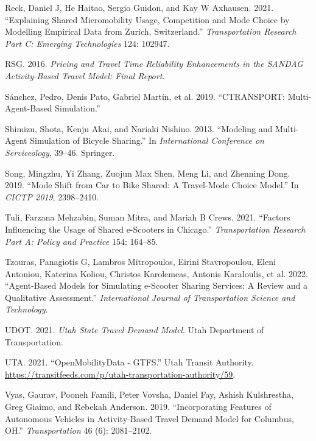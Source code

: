 \documentclass[12pt, oneside, openright]{byuthesis}
\newlength{\cslhangindent}
\newlength{\cslentryspacingunit} %
\newenvironment{CSLReferences}[2] %
 {%
  \setlength{\parindent}{0pt}
  \ifodd #1
  \let\oldpar\par
  \def\par{\hangindent=\cslhangindent\oldpar}
  \fi
  \setlength{\parskip}{#2\cslentryspacingunit}
 }%
 {}
\begin{document}
\begin{CSLReferences}{1}{0}
\leavevmode{}%
Reck, Daniel J, He Haitao, Sergio Guidon, and Kay W Axhausen. 2021. {``Explaining Shared Micromobility Usage, Competition and Mode Choice by Modelling Empirical Data from Zurich, Switzerland.''} \emph{Transportation Research Part C: Emerging Technologies} 124: 102947.

\leavevmode{}%
RSG. 2016. \emph{Pricing and Travel Time Reliability Enhancements in the SANDAG Activity-Based Travel Model: Final Report}.

\leavevmode{}%
Sánchez, Pedro, Denis Pato, Gabriel Martín, et al. 2019. {``CTRANSPORT: Multi-Agent-Based Simulation.''}

\leavevmode{}%
Shimizu, Shota, Kenju Akai, and Nariaki Nishino. 2013. {``Modeling and Multi-Agent Simulation of Bicycle Sharing.''} In \emph{International Conference on Serviceology}, 39--46. Springer.

\leavevmode{}%
Song, Mingzhu, Yi Zhang, Zuojun Max Shen, Meng Li, and Zhenning Dong. 2019. {``Mode Shift from Car to Bike Shared: A Travel-Mode Choice Model.''} In \emph{CICTP 2019}, 2398--2410.

\leavevmode{}%
Tuli, Farzana Mehzabin, Suman Mitra, and Mariah B Crews. 2021. {``Factors Influencing the Usage of Shared e-Scooters in Chicago.''} \emph{Transportation Research Part A: Policy and Practice} 154: 164--85.

\leavevmode{}%
Tzouras, Panagiotis G, Lambros Mitropoulos, Eirini Stavropoulou, Eleni Antoniou, Katerina Koliou, Christos Karolemeas, Antonis Karaloulis, et al. 2022. {``Agent-Based Models for Simulating e-Scooter Sharing Services: A Review and a Qualitative Assessment.''} \emph{International Journal of Transportation Science and Technology}.

\leavevmode{}%
UDOT. 2021. \emph{Utah State Travel Demand Model}. Utah Department of Transportation.

\leavevmode{}%
UTA. 2021. {``OpenMobilityData - GTFS.''} Utah Transit Authority. \url{https://transitfeeds.com/p/utah-transportation-authority/59}.

\leavevmode{}%
Vyas, Gaurav, Pooneh Famili, Peter Vovsha, Daniel Fay, Ashish Kulshrestha, Greg Giaimo, and Rebekah Anderson. 2019. {``Incorporating Features of Autonomous Vehicles in Activity-Based Travel Demand Model for Columbus, OH.''} \emph{Transportation} 46 (6): 2081--2102.


\end{CSLReferences}
\end{document}
